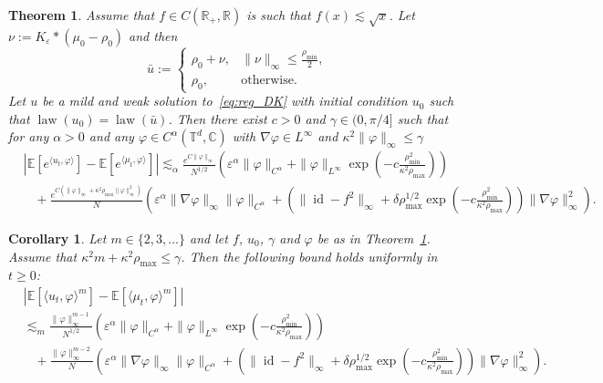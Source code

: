 \documentclass[10pt,a4paper]{amsart}
\newtheorem{theorem}{Theorem}
\newtheorem{corollary}{Corollary}
\newcommand{\C}{\mathbb{C}}
\newcommand{\R}{\mathbb{R}}
\newcommand{\T}{\mathbb{T}}
\begin{document}
\begin{theorem}\label{thm:main-nonlocal-testfunction}
  Assume that $f \in C(\R_+,\R)$ is such that $f (x) \lesssim \sqrt{x}$. Let $\nu := K_\varepsilon *(\mu_0-\rho_0)$ and then
  \[
    \bar{u} := \begin{cases}
        \rho_0 + \nu,
        & \|\nu\|_\infty \leq \frac{\rho_{\min}}{2},\\
        \rho_0,
        & \text{otherwise}.
        \end{cases}
  \]
  Let $u$ be a mild and weak solution to~\eqref{eq:reg_DK}  with initial condition $u_0$ such that $\operatorname{law}(u_0) = \operatorname{law}(\bar u)$. Then there exist $c > 0$ and $\gamma \in (0,\pi/4]$ such that for any $\alpha > 0$ and any $\varphi \in C^{\alpha}(\T^d, \C)$ with $\nabla \varphi \in L^\infty$ and $\kappa^2 \| \varphi\|_\infty \leq \gamma$
  \begin{align} \label{eq:main}
    &| \mathbb{E} [e^{\langle u_t, \varphi \rangle}] -\mathbb{E} [e^{\langle
    \mu_t, \varphi \rangle}] |  \lesssim_{\alpha} \frac{e^{C\|\varphi\|_\infty}}{N^{1/2}}\left(\varepsilon^\alpha \|\varphi\|_{C^\alpha}
        + \|\varphi\|_{L^\infty} 
        \exp\left(-c \frac{\rho_{\min}^2}{\kappa^2\rho_{\max}}\right)\right)\\ \nonumber
    & \hspace{10pt}+ \frac{e^{C (\| \varphi \|_{\infty} + \kappa^2 \rho_{\max} \| \varphi \|_{\infty}^2 )}}{N}
    \left(\varepsilon^{\alpha} \|\nabla \varphi\|_\infty \| \varphi \|_{C^{\alpha}} + (\| \operatorname{id} - f^2 \|_{\infty} + \delta \rho_{\max}^{1/2} \exp\left(-c \frac{\rho_{\min}^2}{\kappa^2\rho_{\max}}\right)) \| \nabla \varphi \|_{\infty}^2\right). 
  \end{align}
\end{theorem}

\begin{corollary}\label{cor:moments}
    Let $m \in \{2,3,\dots\}$ and let $f$, $u_0$, $\gamma$ and $\varphi$ be as in Theorem~\ref{thm:main-nonlocal-testfunction}. Assume that $\kappa^2 m + \kappa^2\rho_{\max} \leq \gamma$. Then the following bound holds uniformly in $t \geq 0$:
    \begin{align*}
        &|\mathbb{E} [\langle u_t, \varphi \rangle^m] -\mathbb{E} [\langle
    \mu_t, \varphi \rangle^m] |   \\
    & \lesssim_m \frac{\|\varphi\|_\infty^{m-1}}{N^{1/2}} \left(\varepsilon^\alpha \|\varphi\|_{C^\alpha}
        + \|\varphi\|_{L^\infty} 
        \exp\left(-c \frac{\rho_{\min}^2}{\kappa^2\rho_{\max}}\right)\right)\\ \nonumber
    & \hspace{10pt}+ \frac{\|\varphi\|_\infty^{m-2}}{N} \left(\varepsilon^{\alpha} \|\nabla \varphi\|_\infty \| \varphi \|_{C^{\alpha}} + (\| \operatorname{id} - f^2 \|_{\infty} + \delta \rho_{\max}^{1/2} \exp\left(-c \frac{\rho_{\min}^2}{\kappa^2\rho_{\max}}\right)) \| \nabla \varphi \|_{\infty}^2\right).
    \end{align*}
\end{corollary}
\end{document}
